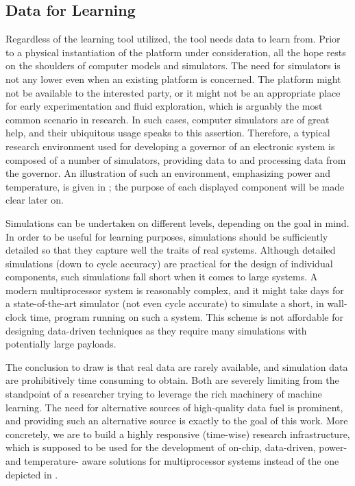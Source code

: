\subsection{Data for Learning}

Regardless of the learning tool utilized, the tool needs data to learn from.
Prior to a physical instantiation of the platform under consideration, all the
hope rests on the shoulders of computer models and simulators. The need for
simulators is not any lower even when an existing platform is concerned. The
platform might not be available to the interested party, or it might not be an
appropriate place for early experimentation and fluid exploration, which is
arguably the most common scenario in research. In such cases, computer
simulators are of great help, and their ubiquitous usage speaks to this
assertion. Therefore, a typical research environment used for developing a
governor of an electronic system is composed of a number of simulators,
providing data to and processing data from the governor. An illustration of such
an environment, emphasizing power and temperature, is given in ;
the purpose of each displayed component will be made clear later on.

Simulations can be undertaken on different levels, depending on the goal in
mind. In order to be useful for learning purposes, simulations should be
sufficiently detailed so that they capture well the traits of real systems.
Although detailed simulations (down to cycle accuracy) are practical for the
design of individual components, such simulations fall short when it comes to
large systems. A modern multiprocessor system is reasonably complex, and it
might take days for a state-of-the-art simulator (not even cycle accurate) to
simulate a short, in wall-clock time, program running on such a system. This
scheme is not affordable for designing data-driven techniques as they require
many simulations with potentially large payloads.

The conclusion to draw is that real data are rarely available, and simulation
data are prohibitively time consuming to obtain. Both are severely limiting from
the standpoint of a researcher trying to leverage the rich machinery of machine
learning. The need for alternative sources of high-quality data fuel is
prominent, and providing such an alternative source is exactly to the goal of
this work. More concretely, we are to build a highly responsive (time-wise)
research infrastructure, which is supposed to be used for the development of
on-chip, data-driven, power- and temperature- aware solutions for multiprocessor
systems instead of the one depicted in .
